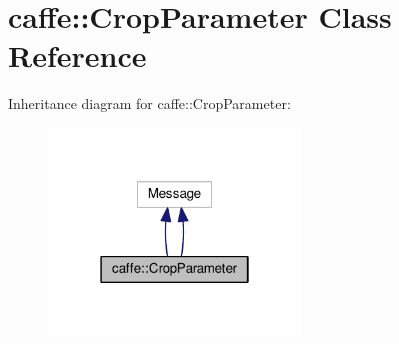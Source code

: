 \hypertarget{classcaffe_1_1_crop_parameter}{}\section{caffe\+:\+:Crop\+Parameter Class Reference}
\label{classcaffe_1_1_crop_parameter}


Inheritance diagram for caffe\+:\+:Crop\+Parameter\+:
\nopagebreak
\begin{figure}[H]
\begin{center}
\leavevmode
\includegraphics[width=190pt]{classcaffe_1_1_crop_parameter__inherit__graph}
\end{center}
\end{figure}
